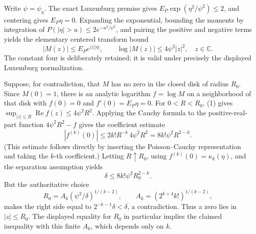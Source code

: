 Write \(\psi=\psi_{\eta}\).  The exact Luxemburg premise gives \(E_P\exp(\eta^2/\psi^2)\le2\), and centering gives \(E_P\eta=0\).  Expanding the exponential, bounding the moments by integration of
\(P(|\eta|>u)\le2e^{-u^2/\psi^2}\), and pairing the positive and negative terms yields the elementary centered transform bound
\[
 |M(z)|\le E_Pe^{|z||\eta|},
 \qquad
 \log |M(z)|\le4\psi^2|z|^2,
 \quad z\in\mathbb C.
 \tag{1}
\]
The constant four is deliberately retained; it is valid under precisely the displayed Luxemburg normalization.

Suppose, for contradiction, that \(M\) has no zero in the closed disk of radius \(R_0\).  Since \(M(0)=1\), there is an analytic logarithm \(f=\log M\) on a neighborhood of that disk with \(f(0)=0\) and \(f'(0)=E_P\eta=0\).  For \(0<R<R_0\), (1) gives \(\sup_{|z|\le R}\operatorname{Re}f(z)\le4\psi^2R^2\).  Applying the Cauchy formula to the positive-real-part function \(4\psi^2R^2-f\) gives the coefficient estimate
\[
 |f^{(k)}(0)|\le 2k!R^{-k}\,4\psi^2R^2
 =8k!\psi^2R^{2-k}.
 \tag{2}
\]
(This estimate follows directly by inserting the Poisson--Cauchy representation and taking the \(k\)-th coefficient.)  Letting \(R\uparrow R_0\), using \(f^{(k)}(0)=\kappa_k(\eta)\), and the separation assumption yields
\[
 \delta\le8k!\psi^2R_0^{2-k}.
\]
But the authoritative choice
\[
 R_0=A_k(\psi^2/\delta)^{1/(k-2)},
 \qquad A_k=(2^{k+4}k!)^{1/(k-2)},
\]
makes the right side equal to \(2^{-k-1}\delta<\delta\), a contradiction.  Thus a zero lies in \(|z|\le R_0\).  The displayed equality for \(R_0\) in particular implies the claimed inequality with this finite \(A_k\), which depends only on \(k\).